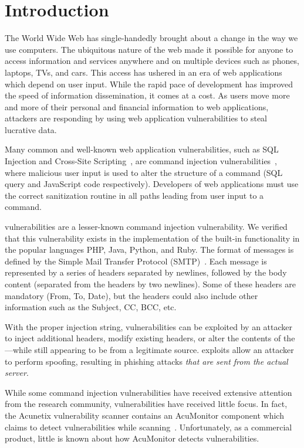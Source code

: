 \section{Introduction}\label{sec:Introduction}
The World Wide Web has single-handedly brought about a change in the way we use computers. The ubiquitous nature of the web made it possible for anyone to access information and services anywhere and on multiple devices such as phones, laptops, TVs, and cars. This access has ushered in an era of web applications which depend on user input. 
While the rapid pace of development has improved the speed of
information dissemination, it comes at a cost. As users move more and
more of their personal and financial information to web applications,
attackers are responding by using web application vulnerabilities to steal lucrative data.

Many common and well-known web application vulnerabilities, such as SQL Injection and Cross-Site Scripting~\cite{OWASPT10}, are command injection vulnerabilities~\cite{commandinjection}, where malicious user input is used to alter the structure of a command (SQL query and JavaScript code respectively). Developers of web applications must use the correct sanitization routine in all paths leading from user input to a command. 

\ehi vulnerabilities are a lesser-known command injection vulnerability. We verified that this vulnerability exists in the implementation of the built-in \email functionality in the popular languages PHP, Java, Python, and Ruby. The format of \email messages is defined by the Simple Mail Transfer Protocol (SMTP)~\cite{rfc5322}. Each \email message is represented by a series of headers separated by newlines, followed by the body content (separated from the headers by two newlines). Some of these headers are mandatory (From, To, Date), but the headers could also include other information such as the Subject, CC, BCC, etc.

With the proper injection string, \ehi vulnerabilities can be exploited by an attacker to inject additional headers, modify existing headers, or alter the contents of the \email---while still appearing to be from a legitimate source. \ehi exploits allow an attacker to perform \email spoofing, resulting in phishing attacks \emph{that are sent from the actual \email server}.

While some command injection vulnerabilities have received extensive attention from the research community, \ehi vulnerabilities have received little focus. In fact, the Acunetix vulnerability scanner contains an AcuMonitor component which claims to detect \ehi vulnerabilities while scanning~\cite{acumonitor}. Unfortunately, as a commercial product, little is known about how AcuMonitor detects \ehi vulnerabilities. 

